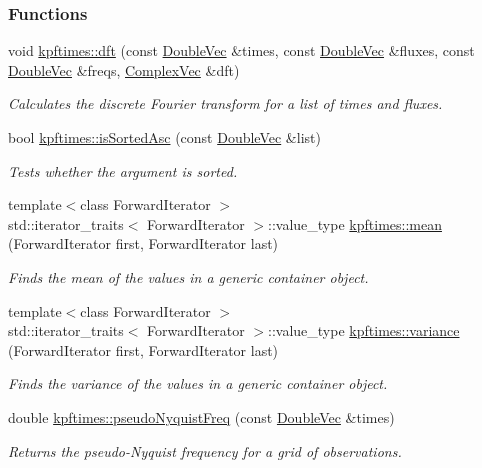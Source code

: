 \subsubsection*{Functions}
\begin{DoxyCompactItemize}
\item 
void \hyperlink{group__util_ga716380f15a77c791f6d22b72687ca9d2}{kpftimes::dft} (const \hyperlink{dft_8h_ae5d5553d1db3abe03c161a5ffd0bf9ad}{DoubleVec} \&times, const \hyperlink{dft_8h_ae5d5553d1db3abe03c161a5ffd0bf9ad}{DoubleVec} \&fluxes, const \hyperlink{dft_8h_ae5d5553d1db3abe03c161a5ffd0bf9ad}{DoubleVec} \&freqs, \hyperlink{dft_8h_a2dcb081ab99acd454f8b3b51e039cdfa}{ComplexVec} \&dft)
\begin{DoxyCompactList}\small\item\em Calculates the discrete Fourier transform for a list of times and fluxes. \end{DoxyCompactList}\item 
bool \hyperlink{group__util_ga09e4d36be1ae592adb744e274fd619d7}{kpftimes::isSortedAsc} (const \hyperlink{dft_8h_ae5d5553d1db3abe03c161a5ffd0bf9ad}{DoubleVec} \&list)
\begin{DoxyCompactList}\small\item\em Tests whether the argument is sorted. \end{DoxyCompactList}\item 
{\footnotesize template$<$class ForwardIterator $>$ }\\std::iterator\_\-traits$<$ ForwardIterator $>$::value\_\-type \hyperlink{group__util_ga4a69dd17d28119657d408b8d26931681}{kpftimes::mean} (ForwardIterator first, ForwardIterator last)
\begin{DoxyCompactList}\small\item\em Finds the mean of the values in a generic container object. \end{DoxyCompactList}\item 
{\footnotesize template$<$class ForwardIterator $>$ }\\std::iterator\_\-traits$<$ ForwardIterator $>$::value\_\-type \hyperlink{group__util_ga2c5ce34d5fee9b6101fc1f617377ffc8}{kpftimes::variance} (ForwardIterator first, ForwardIterator last)
\begin{DoxyCompactList}\small\item\em Finds the variance of the values in a generic container object. \end{DoxyCompactList}\item 
double \hyperlink{group__util_ga4b6ecddd43b6c6caf1d0db59b4a0b613}{kpftimes::pseudoNyquistFreq} (const \hyperlink{dft_8h_ae5d5553d1db3abe03c161a5ffd0bf9ad}{DoubleVec} \&times)
\begin{DoxyCompactList}\small\item\em Returns the pseudo-\/Nyquist frequency for a grid of observations. \end{DoxyCompactList}\end{DoxyCompactItemize}


